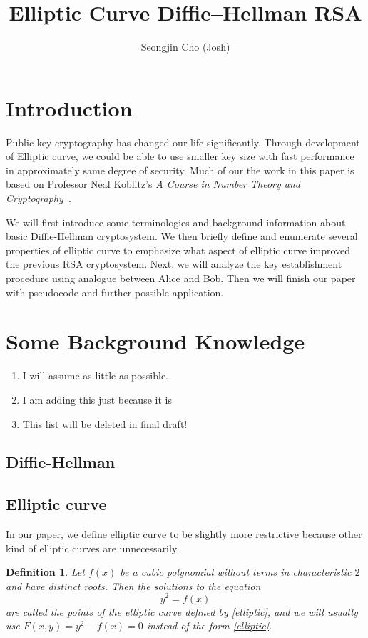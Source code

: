 \documentclass[11pt]{article}
\newtheorem{definition}{Definition}
\begin{document}
\title{Elliptic Curve Diffie–Hellman RSA}
\author{Seongjin Cho (Josh)}
\maketitle

\tableofcontents

\newpage

\section{Introduction}
Public key cryptography has changed our life significantly. Through development of Elliptic curve, we could be able to use smaller key size with fast performance in approximately same degree of security. Much of our the work in this paper is based on Professor Neal Koblitz's  \emph{A Course in Number Theory and Cryptography}~\cite{Neal2}.

We will first introduce some terminologies and background information about basic Diffie-Hellman cryptosystem. We then briefly define and enumerate several properties of elliptic curve to emphasize what aspect of elliptic curve improved the previous RSA cryptosystem. Next, we will analyze the key establishment procedure using analogue between Alice and Bob. Then we will finish our paper with pseudocode and further possible application.


\section{Some Background Knowledge}
\begin{enumerate}
\item I will assume as little as possible.
\item I am adding this just because it is
\item This list will be deleted in final draft!
\end{enumerate}

\subsection{Diffie-Hellman}


\subsection{Elliptic curve}
In our paper, we define elliptic curve to be slightly more restrictive because other kind of elliptic curves are unnecessarily.
\begin{definition}
Let $f(x)$ be a cubic polynomial without terms in characteristic $2$ and have distinct roots. Then the solutions to the equation
\begin{equation}
y^2 = f(x) \label{elliptic}
\end{equation}
are called the points of the elliptic curve defined by \ref{elliptic}, and we will usually use $F(x,y) = y^2 - f(x) = 0$ instead of the form \ref{elliptic}.
\end{definition}
\end{document}
